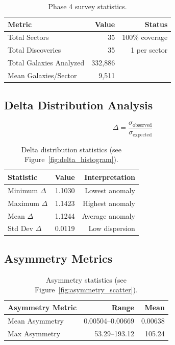 \documentclass[11pt,a4paper]{article}
\begin{document}
\begin{table}[h]
\centering
\begin{tabular}{lrr}
\toprule
\textbf{Metric} & \textbf{Value} & \textbf{Status} \\
\midrule
Total Sectors & 35 & 100\% coverage \\
Total Discoveries & 35 & 1 per sector \\
Total Galaxies Analyzed & 332,886 & \\
Mean Galaxies/Sector & 9,511 & \\
\bottomrule
\end{tabular}
\caption{Phase 4 survey statistics.}
\label{tab:survey_stats}
\end{table}

\subsection{Delta Distribution Analysis}
\label{sec:statistical_significance}

\begin{equation}
\Delta = \frac{\sigma_{\text{observed}}}{\sigma_{\text{expected}}}
\end{equation}

\begin{table}[h]
\centering
\begin{tabular}{lrr}
\toprule
\textbf{Statistic} & \textbf{Value} & \textbf{Interpretation} \\
\midrule
Minimum $\Delta$ & 1.1030 & Lowest anomaly \\
Maximum $\Delta$ & 1.1423 & Highest anomaly \\
Mean $\Delta$ & 1.1244 & Average anomaly \\
Std Dev $\Delta$ & 0.0119 & Low dispersion \\
\bottomrule
\end{tabular}
\caption{Delta distribution statistics (see Figure~\ref{fig:delta_histogram}).}
\label{tab:delta_stats}
\end{table}

\subsection{Asymmetry Metrics}

\begin{table}[h]
\centering
\begin{tabular}{lrr}
\toprule
\textbf{Asymmetry Metric} & \textbf{Range} & \textbf{Mean} \\
\midrule
Mean Asymmetry & 0.00504--0.00669 & 0.00638 \\
Max Asymmetry & 53.29--193.12 & 105.24 \\
\bottomrule
\end{tabular}
\caption{Asymmetry statistics (see Figure~\ref{fig:asymmetry_scatter}).}
\label{tab:asymmetry}
\end{table}
\end{document}

